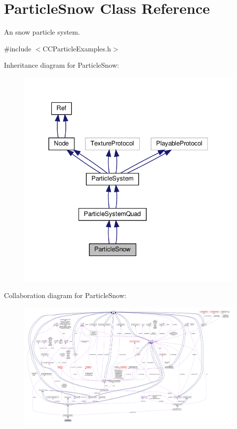 \hypertarget{classParticleSnow}{}\section{Particle\+Snow Class Reference}
\label{classParticleSnow}


An snow particle system.  




{\ttfamily \#include $<$C\+C\+Particle\+Examples.\+h$>$}



Inheritance diagram for Particle\+Snow\+:
\nopagebreak
\begin{figure}[H]
\begin{center}
\leavevmode
\includegraphics[width=332pt]{classParticleSnow__inherit__graph}
\end{center}
\end{figure}


Collaboration diagram for Particle\+Snow\+:
\nopagebreak
\begin{figure}[H]
\begin{center}
\leavevmode
\includegraphics[width=350pt]{classParticleSnow__coll__graph}
\end{center}
\end{figure}
